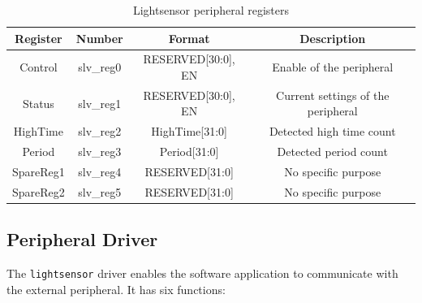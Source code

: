 \documentclass[11pt]{article}
\begin{document}
	\begin {table}[H]
	\begin {center} 
	\vspace{15pt}
	
	\begin{tabular}{||c|c|c|c||}\hline
		\textbf{Register}	&	\textbf{Number}	&	\textbf{Format} 	& 	\textbf{Description}		\\\hline
		Control				&	slv\_reg0		&	{RESERVED[30:0], EN} &  Enable of the peripheral 		\\\hline
		Status				&	slv\_reg1		&	{RESERVED[30:0], EN} & Current settings of the peripheral		\\\hline
		HighTime			&	slv\_reg2		&    HighTime[31:0] 	&	Detected high time count  			\\\hline
		Period				&	slv\_reg3		&  	Period[31:0] 		&	Detected period count 			\\\hline
		SpareReg1			&	slv\_reg4		&	RESERVED[31:0] 		& 	No specific purpose 			\\\hline
		SpareReg2			&	slv\_reg5		&	RESERVED[31:0] 		& 	No specific purpose 			\\\hline
	\end{tabular}
		\caption {Lightsensor peripheral registers} \label{registers}
	\end{center}
	\end{table} 
	
\subsection{Peripheral Driver}
The \texttt{lightsensor} driver enables the software application to communicate with the external peripheral. It has six functions: 
\end{document}
